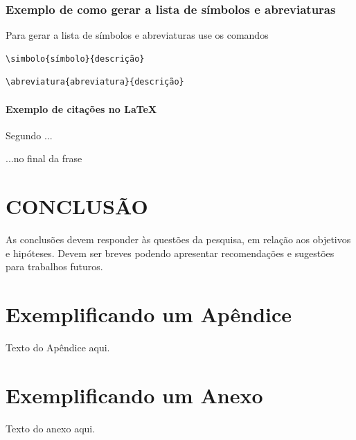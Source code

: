 \documentclass{ufscThesis} %
\begin{document}
\subsection{Exemplo de como gerar a lista de símbolos e abreviaturas}

Para gerar a lista de símbolos e abreviaturas use os comandos


\begin{lstlisting}
\simbolo{símbolo}{descrição}
\end{lstlisting}

\begin{lstlisting}
\abreviatura{abreviatura}{descrição}
\end{lstlisting}

\subsubsection{Exemplo de citações no \LaTeX}

Segundo  ...

...no final da frase \cite{abnt14724,BU_formatoA5}


\nocite{alves_2001,abnt10520,abnt6024,abnt14724}



\chapter{CONCLUSÃO}

As conclusões devem responder às questões da pesquisa, em relação aos objetivos e hipóteses. Devem ser breves podendo apresentar recomendações e sugestões para trabalhos futuros.




\apendice
\chapter{Exemplificando um Apêndice}
Texto do Apêndice aqui. 

\anexo
\chapter{Exemplificando um Anexo}
Texto do anexo aqui.
\end{document}
